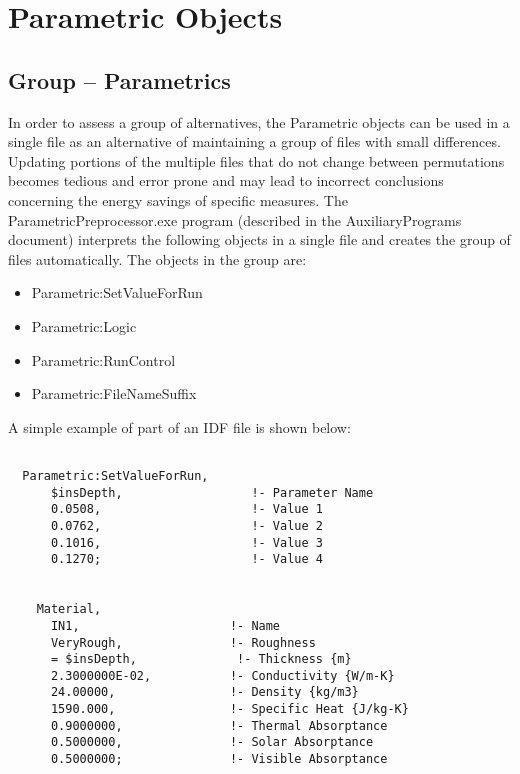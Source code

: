 \chapter{Parametric Objects}\label{parametric-objects}

\section{Group -- Parametrics}\label{group-parametrics}

In order to assess a group of alternatives, the Parametric objects can be used in a single file as an alternative of maintaining a group of files with small differences. Updating portions of the multiple files that do not change between permutations becomes tedious and error prone and may lead to incorrect conclusions concerning the energy savings of specific measures. The ParametricPreprocessor.exe program (described in the AuxiliaryPrograms document) interprets the following objects in a single file and creates the group of files automatically. The objects in the group are:

\begin{itemize}
\item
  Parametric:SetValueForRun
\item
  Parametric:Logic
\item
  Parametric:RunControl
\item
  Parametric:FileNameSuffix
\end{itemize}

A simple example of part of an IDF file is shown below:

\begin{lstlisting}

  Parametric:SetValueForRun,
      $insDepth,                  !- Parameter Name
      0.0508,                     !- Value 1
      0.0762,                     !- Value 2
      0.1016,                     !- Value 3
      0.1270;                     !- Value 4


    Material,
      IN1,                     !- Name
      VeryRough,               !- Roughness
      = $insDepth,              !- Thickness {m}
      2.3000000E-02,           !- Conductivity {W/m-K}
      24.00000,                !- Density {kg/m3}
      1590.000,                !- Specific Heat {J/kg-K}
      0.9000000,               !- Thermal Absorptance
      0.5000000,               !- Solar Absorptance
      0.5000000;               !- Visible Absorptance
\end{lstlisting}

